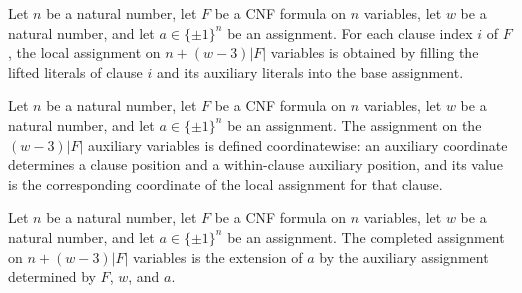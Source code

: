 \begin{definition}
\label{FABL.widthThreeTseitinLocalAssignment}
\leanok
{}
Let $n$ be a natural number, let $F$ be a CNF formula on $n$ variables, let $w$ be a
natural number, and let $a\in\{\pm1\}^n$ be an assignment. For each clause index $i$ of
$F$, the local assignment on $n+(w-3)|F|$ variables is obtained by filling the lifted
literals of clause $i$ and its auxiliary literals into the base assignment.
\end{definition}

\begin{definition}
\label{FABL.widthThreeTseitinProof}
\leanok
{}
Let $n$ be a natural number, let $F$ be a CNF formula on $n$ variables, let $w$ be a
natural number, and let $a\in\{\pm1\}^n$ be an assignment. The assignment on the
$(w-3)|F|$ auxiliary variables is defined coordinatewise: an auxiliary coordinate
determines a clause position and a within-clause auxiliary position, and its value is
the corresponding coordinate of the local assignment for that clause.
\end{definition}

\begin{definition}
\label{FABL.widthThreeTseitinCompletedAssignment}
\leanok
{}
Let $n$ be a natural number, let $F$ be a CNF formula on $n$ variables, let $w$ be a
natural number, and let $a\in\{\pm1\}^n$ be an assignment. The completed assignment on
$n+(w-3)|F|$ variables is the extension of $a$ by the auxiliary assignment determined by
$F$, $w$, and $a$.
\end{definition}

